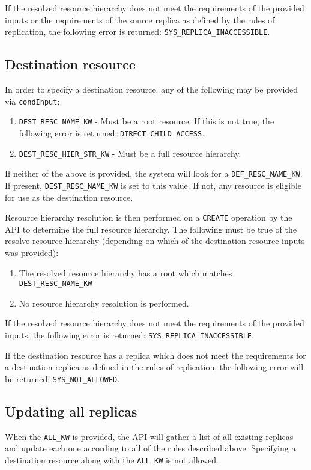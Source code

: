 \documentclass{irodsugm}
\begin{document}
If the resolved resource hierarchy does not meet the requirements of the provided inputs or the requirements of the source replica as defined by the rules of replication, the following error is returned: \texttt{SYS\_REPLICA\_INACCESSIBLE}.

\subsection*{Destination resource}
In order to specify a destination resource, any of the following may be provided via \texttt{condInput}:

\begin{enumerate}
    \item \texttt{DEST\_RESC\_NAME\_KW} - Must be a root resource. If this is not true, the following error is returned: \texttt{DIRECT\_CHILD\_ACCESS}.
    \item \texttt{DEST\_RESC\_HIER\_STR\_KW} - Must be a full resource hierarchy.
\end{enumerate}

If neither of the above is provided, the system will look for a \texttt{DEF\_RESC\_NAME\_KW}. If present, \texttt{DEST\_RESC\_NAME\_KW} is set to this value. If not, any resource is eligible for use as the destination resource.

Resource hierarchy resolution is then performed on a \texttt{CREATE} operation by the API to determine the full resource hierarchy. The following must be true of the resolve resource hierarchy (depending on which of the destination resource inputs was provided):

\begin{enumerate}
    \item The resolved resource hierarchy has a root which matches \texttt{DEST\_RESC\_NAME\_KW}
    \item No resource hierarchy resolution is performed.
\end{enumerate}

If the resolved resource hierarchy does not meet the requirements of the provided inputs, the following error is returned: \texttt{SYS\_REPLICA\_INACCESSIBLE}.

If the destination resource has a replica which does not meet the requirements for a destination replica as defined in the rules of replication, the following error will be returned: \texttt{SYS\_NOT\_ALLOWED}.

\subsection*{Updating all replicas}
When the \texttt{ALL\_KW} is provided, the API will gather a list of all existing replicas and update each one according to all of the rules described above. Specifying a destination resource along with the \texttt{ALL\_KW} is not allowed.
\end{document}
